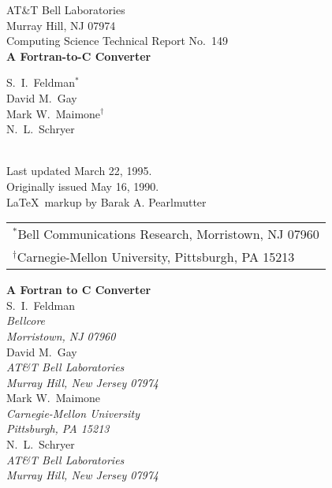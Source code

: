 \documentclass[10pt,a4paper]{article}
\begin{document}
\begin{titlepage}
  \begin{center}
    \vspace*{12ex}
    AT\&T Bell Laboratories\\
    Murray Hill, NJ 07974
    \\[25ex]
    Computing Science Technical Report No.\ 149
    \\[4ex]
    \textbf{\large A Fortran-to-C Converter}
    \\[3ex]
    \begin{itshape}
    S.\ I.\ Feldman$^{*}$\\
    David M.\ Gay\\
    Mark W.\ Maimone$^{\text{†}}$\\
    N.\ L.\ Schryer
    \end{itshape}
      \\[53ex]
    Last updated March 22, 1995.\\
    Originally issued May 16, 1990.\\
    \LaTeX\ markup by Barak A. Pearlmutter
    \\[8ex]
    \begin{tabular}{l}
      $^{*}$Bell Communications Research, Morristown, NJ 07960\\[1ex]
      $^{\text{†}}$Carnegie-Mellon University, Pittsburgh, PA 15213
    \end{tabular}
  \end{center}
\end{titlepage}

\thispagestyle{empty}

\vspace*{5ex}

\begin{center}
\textbf{\large A Fortran to C Converter}
\\[3ex]
S.\ I.\ Feldman\\[1ex]
\emph{Bellcore}\\
\emph{Morristown, NJ 07960}
\\[2ex]
David M.\ Gay\\[1ex]
\emph{AT\&T Bell Laboratories}\\
\emph{Murray Hill, New Jersey 07974}
\\[2ex]
Mark W.\ Maimone\\[1ex]
\emph{Carnegie-Mellon University}\\
\emph{Pittsburgh, PA 15213}
\\[2ex]
N.\ L.\ Schryer\\[1ex]
\emph{AT\&T Bell Laboratories}\\
\emph{Murray Hill, New Jersey 07974}
\end{center}
\end{document}
